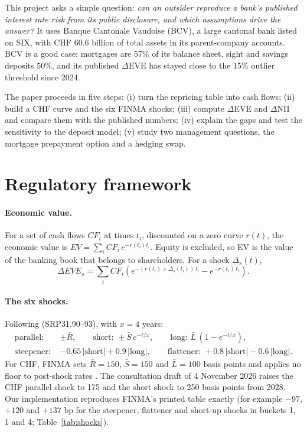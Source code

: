 \documentclass[11pt,a4paper]{article}
\newcommand{\dEVE}{$\Delta$EVE}
\newcommand{\dNII}{$\Delta$NII}
\begin{document}
This project asks a simple question: \emph{can an outsider reproduce a bank's published interest rate risk from its public disclosure, and which assumptions drive the answer?} It uses Banque Cantonale Vaudoise (BCV), a large cantonal bank listed on SIX, with CHF 60.6 billion of total assets in its parent-company accounts. BCV is a good case: mortgages are 57\% of its balance sheet, sight and savings deposits 50\%, and its published \dEVE{} has stayed close to the 15\% outlier threshold since 2024.

The paper proceeds in five steps: (i) turn the repricing table into cash flows; (ii) build a CHF curve and the six FINMA shocks; (iii) compute \dEVE{} and \dNII{} and compare them with the published numbers; (iv) explain the gaps and test the sensitivity to the deposit model; (v) study two management questions, the mortgage prepayment option and a hedging swap.

\section{Regulatory framework}

\paragraph{Economic value.} For a set of cash flows $CF_i$ at times $t_i$, discounted on a zero curve $r(t)$, the economic value is $EV = \sum_i CF_i\, e^{-r(t_i) t_i}$. Equity is excluded, so EV is the value of the banking book that belongs to shareholders. For a shock $\Delta_s(t)$,
\begin{equation}
\Delta EVE_s = \sum_i CF_i \left( e^{-(r(t_i)+\Delta_s(t_i))\,t_i} - e^{-r(t_i)\,t_i} \right).
\end{equation}

\paragraph{The six shocks.} Following \citet{bcbs2016} (SRP31.90--93), with $x = 4$ years:
\begin{align*}
\text{parallel: } & \pm \bar R, \qquad \text{short: } \pm \bar S\, e^{-t/x}, \qquad \text{long: } \bar L\,(1-e^{-t/x}),\\
\text{steepener: } & -0.65\,|\text{short}| + 0.9\,|\text{long}|, \qquad \text{flattener: } +0.8\,|\text{short}| - 0.6\,|\text{long}|.
\end{align*}
For CHF, FINMA sets $\bar R = 150$, $\bar S = 150$ and $\bar L = 100$ basis points and applies no floor to post-shock rates \citep{finma2019}. The consultation draft of 4 November 2026 raises the CHF parallel shock to 175 and the short shock to 250 basis points from 2028. Our implementation reproduces FINMA's printed table exactly (for example $-97$, $+120$ and $+137$ bp for the steepener, flattener and short-up shocks in buckets 1, 1 and 4; Table~\ref{tab:shocks}).
\end{document}
